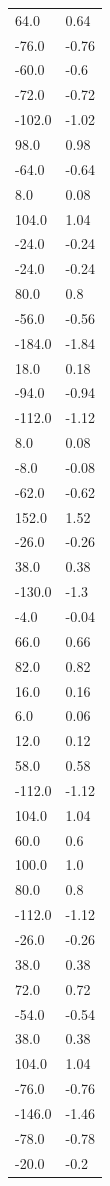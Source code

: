 \begin{longtable}{ll}
64.0 & 0.64 \\
-76.0 & -0.76 \\
-60.0 & -0.6 \\
-72.0 & -0.72 \\
-102.0 & -1.02 \\
98.0 & 0.98 \\
-64.0 & -0.64 \\
8.0 & 0.08 \\
104.0 & 1.04 \\
-24.0 & -0.24 \\
-24.0 & -0.24 \\
80.0 & 0.8 \\
-56.0 & -0.56 \\
-184.0 & -1.84 \\
18.0 & 0.18 \\
-94.0 & -0.94 \\
-112.0 & -1.12 \\
8.0 & 0.08 \\
-8.0 & -0.08 \\
-62.0 & -0.62 \\
152.0 & 1.52 \\
-26.0 & -0.26 \\
38.0 & 0.38 \\
-130.0 & -1.3 \\
-4.0 & -0.04 \\
66.0 & 0.66 \\
82.0 & 0.82 \\
16.0 & 0.16 \\
6.0 & 0.06 \\
12.0 & 0.12 \\
58.0 & 0.58 \\
-112.0 & -1.12 \\
104.0 & 1.04 \\
60.0 & 0.6 \\
100.0 & 1.0 \\
80.0 & 0.8 \\
-112.0 & -1.12 \\
-26.0 & -0.26 \\
38.0 & 0.38 \\
72.0 & 0.72 \\
-54.0 & -0.54 \\
38.0 & 0.38 \\
104.0 & 1.04 \\
-76.0 & -0.76 \\
-146.0 & -1.46 \\
-78.0 & -0.78 \\
-20.0 & -0.2 \\

\end{longtable}
